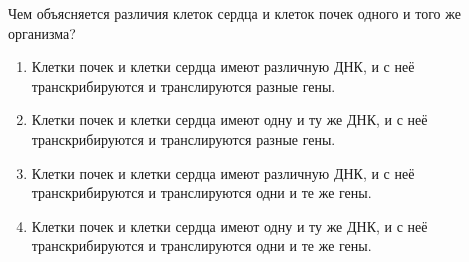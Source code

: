 
Чем объясняется различия клеток сердца и клеток
почек одного и того же организма?

\begin{enumerate}
    \item Клетки почек и клетки сердца имеют различную ДНК, и с неё транскрибируются и транслируются разные гены.
    \item Клетки почек и клетки сердца имеют одну и ту же ДНК, и с неё транскрибируются и транслируются разные гены. 
    \item Клетки почек и клетки сердца имеют различную ДНК, и с неё транскрибируются и транслируются одни и те же гены. 
    \item Клетки почек и клетки сердца имеют одну и ту же ДНК, и с неё транскрибируются и транслируются одни и те же гены.
\end{enumerate}

